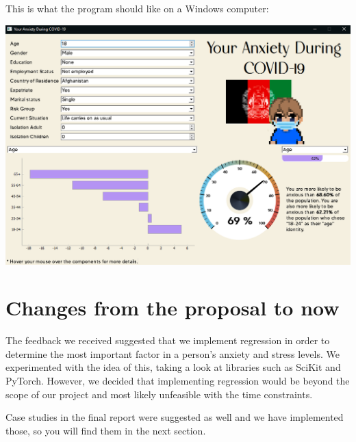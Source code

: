 \documentclass[fontsize=11pt]{article}
\begin{document}
    \begin{center}
        This is what the program should like on a Windows computer:
    \end{center}
    \begin{center}
        \includegraphics[scale=0.35]{img/example_screenshot}
    \end{center}

    \section*{Changes from the proposal to now}
    The feedback we received suggested that we implement regression in order to determine the most important factor in a person’s anxiety and stress levels. We experimented with the idea of this, taking a look at libraries such as SciKit and PyTorch. However, we decided that implementing regression would be beyond the scope of our project and most likely unfeasible with the time constraints.

    Case studies in the final report were suggested as well and we have implemented those, so you will find them in the next section.
\end{document}
